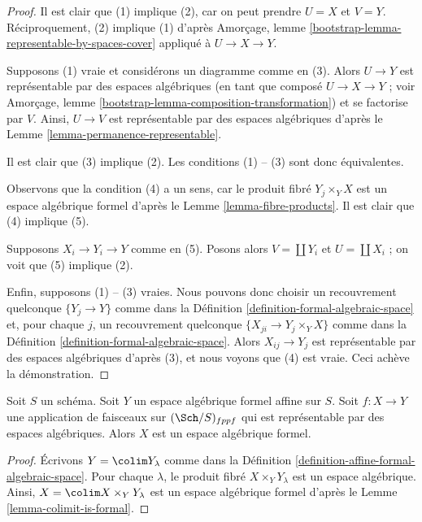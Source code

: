 \begin{proof}
Il est clair que (1) implique (2), car on peut prendre $U = X$ et $V = Y$.
Réciproquement, (2) implique (1) d'après
Amorçage, lemme \ref{bootstrap-lemma-representable-by-spaces-cover}
appliqué à $U \to X \to Y$.

\medskip\noindent
Supposons (1) vraie et considérons un diagramme comme en (3).
Alors $U \to Y$ est représentable par des espaces algébriques
(en tant que composé $U \to X \to Y$ ; voir
Amorçage, lemme \ref{bootstrap-lemma-composition-transformation})
et se factorise par $V$. Ainsi, $U \to V$ est représentable par des
espaces algébriques d'après le Lemme \ref{lemma-permanence-representable}.

\medskip\noindent
Il est clair que (3) implique (2). Les conditions (1) -- (3) sont donc équivalentes.

\medskip\noindent
Observons que la condition (4) a un sens, car le produit fibré
$Y_j \times_Y X$ est un espace algébrique formel d'après le
Lemme \ref{lemma-fibre-products}.
Il est clair que (4) implique (5).

\medskip\noindent
Supposons $X_i \to Y_i \to Y$ comme en (5). Posons alors
$V = \coprod Y_i$ et $U = \coprod X_i$ ; on voit que
(5) implique (2).

\medskip\noindent
Enfin, supposons (1) -- (3) vraies.
Nous pouvons donc choisir un recouvrement quelconque $\{Y_j \to Y\}$ comme dans la
Définition \ref{definition-formal-algebraic-space}
et, pour chaque $j$, un recouvrement quelconque $\{X_{ji} \to Y_j \times_Y X\}$ comme dans la
Définition \ref{definition-formal-algebraic-space}.
Alors $X_{ij} \to Y_j$ est représentable par des espaces algébriques d'après (3),
et nous voyons que (4) est vraie. Ceci achève la démonstration.
\end{proof}

\begin{lemma}
\label{lemma-algebraic-space-over-affine-formal}
Soit $S$ un schéma. Soit $Y$ un espace algébrique formel affine sur $S$.
Soit $f : X \to Y$ une application de faisceaux sur $(\Sch/S)_{fppf}$ qui est
représentable par des espaces algébriques. Alors $X$ est un espace
algébrique formel.
\end{lemma}

\begin{proof}
Écrivons $Y = \colim Y_\lambda$ comme dans la
Définition \ref{definition-affine-formal-algebraic-space}.
Pour chaque $\lambda$, le produit fibré
$X \times_Y Y_\lambda$ est un espace algébrique.
Ainsi, $X = \colim X \times_Y Y_\lambda$ est un espace
algébrique formel d'après le Lemme \ref{lemma-colimit-is-formal}.
\end{proof}

